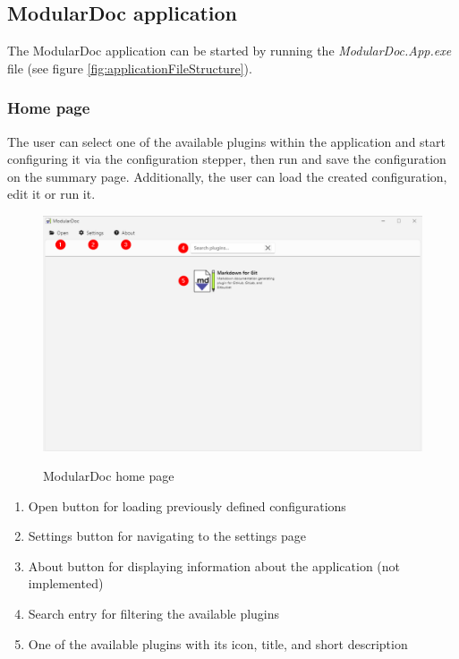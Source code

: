 \subsection{ModularDoc application}

The ModularDoc application can be started by running the \textit{ModularDoc.App.exe} file (see figure \ref{fig:applicationFileStructure}).

\subsubsection{Home page}

The user can select one of the available plugins within the application and start configuring it via the configuration stepper, then run and save the configuration on the summary page.
Additionally, the user can load the created configuration, edit it or run it.

\begin{figure}[H]
    \includegraphics[width=\linewidth]{img/modularDocHomePage.png}
    \label{fig:modularDocHome}
    \caption{ModularDoc home page}
\end{figure}

\begin{enumerate}
    \item Open button for loading previously defined configurations
    \item Settings button for navigating to the settings page
    \item About button for displaying information about the application (not implemented)
    \item Search entry for filtering the available plugins
    \item One of the available plugins with its icon, title, and short description
\end{enumerate}

